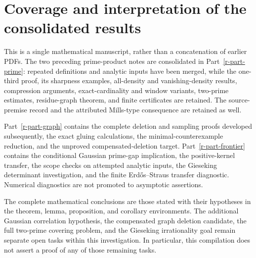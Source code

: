 \documentclass[11pt,a4paper]{article}
\theoremstyle{definition}
\theoremstyle{remark}
\begin{document}
\section{Coverage and interpretation of the consolidated results}\label{r-coverage}
This is a single mathematical manuscript, rather than a concatenation of
earlier PDFs. The two preceding prime-product notes are consolidated in
Part~\ref{r-part-prime}: repeated definitions and analytic inputs have
been merged, while the one-third proof, its sharpness examples,
all-density and vanishing-density results, compression arguments,
exact-cardinality and window variants, two-prime estimates, residue-graph
theorem, and finite certificates are retained. The source-premise record
and the attributed Mills-type consequence are retained as well.

Part~\ref{r-part-graph} contains the complete deletion and sampling
proofs developed subsequently, the exact gluing calculations, the
minimal-counterexample reduction, and the unproved compensated-deletion
target. Part~\ref{r-part-frontier} contains the conditional Gaussian
prime-gap implication, the positive-kernel transfer, the scope checks on
attempted analytic inputs, the Gieseking determinant investigation, and
the finite Erd\H{o}s--Straus transfer diagnostic. Numerical diagnostics
are not promoted to asymptotic assertions.

The complete mathematical conclusions are those stated with their
hypotheses in the theorem, lemma, proposition, and corollary environments.
The additional Gaussian correlation hypothesis, the compensated graph
deletion candidate, the full two-prime covering problem, and the
Gieseking irrationality goal remain separate open tasks within this
investigation. In particular, this compilation does not assert a proof
of any of those remaining tasks.
\end{document}
